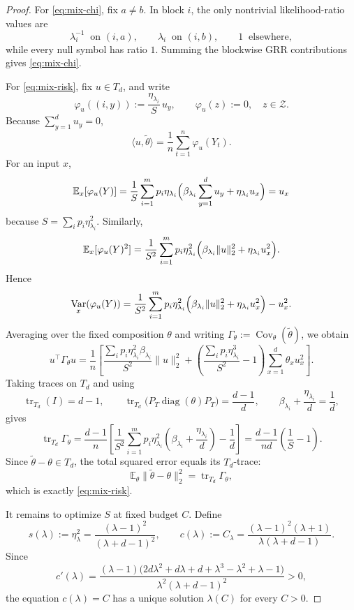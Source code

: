 \documentclass[11pt]{amsart}
\numberwithin{equation}{section}
\theoremstyle{definition}
\newcommand{\E}{\mathbb E}
\DeclareMathOperator{\Var}{Var}
\DeclareMathOperator{\Cov}{Cov}
\DeclareMathOperator{\diag}{diag}
\begin{document}
\begin{proof}
For \eqref{eq:mix-chi}, fix \(a\neq b\).
In block \(i\), the only nontrivial likelihood-ratio values are
\[
\lambda_i^{-1}\ \text{ on } (i,a),\qquad
\lambda_i\ \text{ on } (i,b),\qquad
1\ \text{ elsewhere},
\]
while every null symbol has ratio \(1\).  Summing the blockwise GRR contributions gives
\eqref{eq:mix-chi}.

For \eqref{eq:mix-risk}, fix \(u\in T_d\), and write
\[
\varphi_u((i,y)):=\frac{\eta_{\lambda_i}}{S}\,u_y,
\qquad
\varphi_u(z):=0,\quad z\in\mathcal Z.
\]
Because \(\sum_{y=1}^d u_y=0\),
\[
\langle u,\widetilde\theta\rangle
=
\frac{1}{n}\sum_{t=1}^n \varphi_u(Y_t).
\]
For an input \(x\),
\[
\E_x[\varphi_u(Y)]
=
\frac{1}{S}\sum_{i=1}^m p_i\eta_{\lambda_i}
\Bigl(\beta_{\lambda_i}\sum_{y=1}^d u_y+\eta_{\lambda_i}u_x\Bigr)
=
u_x
\]
because \(S=\sum_i p_i\eta_{\lambda_i}^2\).
Similarly,
\[
\E_x[\varphi_u(Y)^2]
=
\frac{1}{S^2}\sum_{i=1}^m p_i\eta_{\lambda_i}^2
\Bigl(\beta_{\lambda_i}\|u\|_2^2+\eta_{\lambda_i}u_x^2\Bigr).
\]
Hence
\[
\Var_x(\varphi_u(Y))
=
\frac{1}{S^2}\sum_{i=1}^m p_i\eta_{\lambda_i}^2
\Bigl(\beta_{\lambda_i}\|u\|_2^2+\eta_{\lambda_i}u_x^2\Bigr)-u_x^2.
\]
Averaging over the fixed composition \(\theta\) and writing
\(\Gamma_\theta:=\Cov_\theta(\widetilde\theta)\),
we obtain
\[
u^\top\Gamma_\theta u
=
\frac{1}{n}
\left[
\frac{\sum_i p_i\eta_{\lambda_i}^2\beta_{\lambda_i}}{S^2}\|u\|_2^2
+
\left(
\frac{\sum_i p_i\eta_{\lambda_i}^3}{S^2}-1
\right)
\sum_{x=1}^d \theta_x u_x^2
\right].
\]
Taking traces on \(T_d\) and using
\[
\operatorname{tr}_{T_d}(I)=d-1,
\qquad
\operatorname{tr}_{T_d}\!\bigl(P_T\diag(\theta)P_T\bigr)=\frac{d-1}{d},
\qquad
\beta_{\lambda_i}+\frac{\eta_{\lambda_i}}{d}=\frac1d,
\]
gives
\[
\operatorname{tr}_{T_d}\Gamma_\theta
=
\frac{d-1}{n}
\left[
\frac{1}{S^2}\sum_{i=1}^m p_i\eta_{\lambda_i}^2
\left(\beta_{\lambda_i}+\frac{\eta_{\lambda_i}}{d}\right)
-\frac1d
\right]
=
\frac{d-1}{nd}\left(\frac{1}{S}-1\right).
\]
Since \(\widetilde\theta-\theta\in T_d\), the total squared error equals its \(T_d\)-trace:
\[
\E_\theta\|\widetilde\theta-\theta\|_2^2
=
\operatorname{tr}_{T_d}\Gamma_\theta,
\]
which is exactly \eqref{eq:mix-risk}.

It remains to optimize \(S\) at fixed budget \(C\).
Define
\[
s(\lambda):=\eta_\lambda^2=\frac{(\lambda-1)^2}{(\lambda+d-1)^2},
\qquad
c(\lambda):=C_\lambda=\frac{(\lambda-1)^2(\lambda+1)}{\lambda(\lambda+d-1)}.
\]
Since
\[
c'(\lambda)
=
\frac{(\lambda-1)\bigl(2d\lambda^2+d\lambda+d+\lambda^3-\lambda^2+\lambda-1\bigr)}
{\lambda^2(\lambda+d-1)^2}
>0,
\]
the equation \(c(\lambda)=C\) has a unique solution \(\lambda(C)\) for every \(C>0\).


\end{proof}
\end{document}
